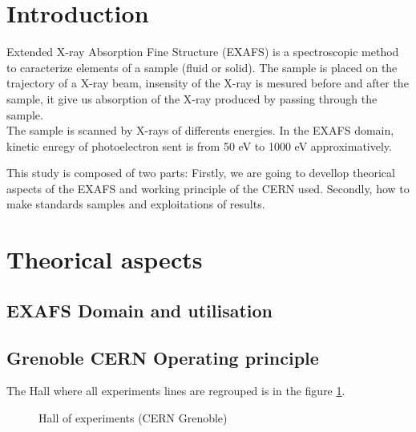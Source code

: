 \documentclass[11pt,a4paper,oneside]{article}
\begin{document}


\section*{Introduction}
	
		
Extended X-ray Absorption Fine Structure (EXAFS) is a spectroscopic method to caracterize elements of a sample (fluid or solid). The sample is placed on the trajectory of a X-ray beam, insensity of the X-ray is mesured before and after the sample, it give us absorption of the X-ray produced by passing through the sample.\\
 The sample is scanned by X-rays of differents energies. In the EXAFS domain, kinetic enregy of photoelectron sent is from 50 eV to 1000 eV approximatively.\medskip
	 
 This study is composed of two parts: Firstly, we are going to devellop theorical aspects of the EXAFS and working principle of the CERN used. Secondly, how to make standards samples and exploitations of results.
	



\newpage
	

\section{Theorical aspects}
\subsection{EXAFS Domain and utilisation}


\subsection{Grenoble CERN Operating principle}

The Hall where all experiments lines are regrouped is in the figure \ref{Hall}.\medskip

\begin{figure}[H]
    \begin{center}
        \caption{Hall of experiments (CERN Grenoble)}
        \label{Hall}
    \end{center}
\end{figure}
\medskip



\newpage
\end{document}
